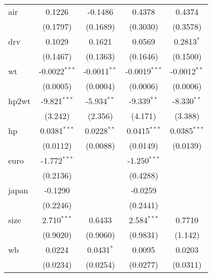 \begin{tabular}{lcccc}
   air                          & 0.1226          & -0.1486         & 0.4378                 & 0.4374\\   
                                & (0.1797)        & (0.1689)        & (0.3030)               & (0.3578)\\   
   drv                          & 0.1029          & 0.1621          & 0.0569                 & 0.2813$^{*}$\\   
                                & (0.1467)        & (0.1363)        & (0.1646)               & (0.1500)\\   
   wt                           & -0.0022$^{***}$ & -0.0011$^{**}$  & -0.0019$^{***}$        & -0.0012$^{**}$\\   
                                & (0.0005)        & (0.0004)        & (0.0006)               & (0.0006)\\   
   hp2wt                        & -9.821$^{***}$  & -5.934$^{**}$   & -9.339$^{**}$          & -8.330$^{**}$\\   
                                & (3.242)         & (2.356)         & (4.171)                & (3.388)\\   
   hp                           & 0.0381$^{***}$  & 0.0228$^{**}$   & 0.0415$^{***}$         & 0.0385$^{***}$\\   
                                & (0.0112)        & (0.0088)        & (0.0149)               & (0.0139)\\   
   euro                         & -1.772$^{***}$  &                 & -1.250$^{***}$         &   \\   
                                & (0.2136)        &                 & (0.4288)               &   \\   
   japan                        & -0.1290         &                 & -0.0259                &   \\   
                                & (0.2246)        &                 & (0.2441)               &   \\   
   size                         & 2.710$^{***}$   & 0.6433          & 2.584$^{***}$          & 0.7710\\   
                                & (0.9020)        & (0.9060)        & (0.9831)               & (1.142)\\   
   wb                           & 0.0224          & 0.0431$^{*}$    & 0.0095                 & 0.0203\\   
                                & (0.0234)        & (0.0254)        & (0.0277)               & (0.0311)\\   

\end{tabular}
